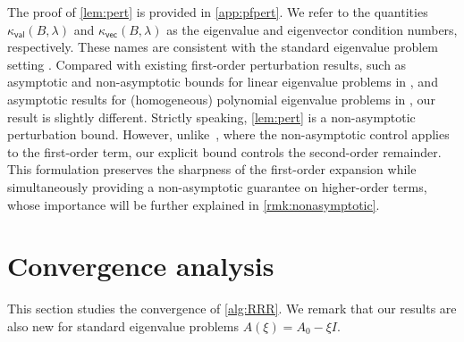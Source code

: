 \documentclass[a4paper,11pt]{article}
\newcommand{\kval}{\kappa_{\mathsf{val}}}
\newcommand{\kvec}{\kappa_{\mathsf{vec}}}
\begin{document}
The proof of \cref{lem:pert} is provided in \cref{app:pfpert}. 
We refer to the quantities $\kval(B,\lambda)$ and $\kvec(B,\lambda)$ as the eigenvalue and eigenvector condition numbers, respectively.
These names are consistent with the standard eigenvalue problem setting \cite[pp.~48--50]{Stewart2001}.
Compared with existing first-order perturbation results, such as asymptotic and non-asymptotic bounds for linear eigenvalue problems in \cite{Stewart1990}, and asymptotic results for (homogeneous) polynomial eigenvalue problems in \cite{Dedieu2000}, our result is slightly different.
Strictly speaking, \cref{lem:pert} is a non-asymptotic perturbation bound.
However, unlike~\cite{Stewart1990}, where the non-asymptotic control applies to the first-order term, our explicit bound controls the second-order remainder.
This formulation preserves the sharpness of the first-order expansion while simultaneously providing a non-asymptotic guarantee on higher-order terms, whose importance will be further explained in \cref{rmk:nonasymptotic}.




\section{Convergence analysis}
\label{sec:theory}
This section studies the convergence of \cref{alg:RRR}.
We remark that our results are also new for standard eigenvalue problems $A(\xi)=A_{0}-\xi I$.

 
\end{document}

